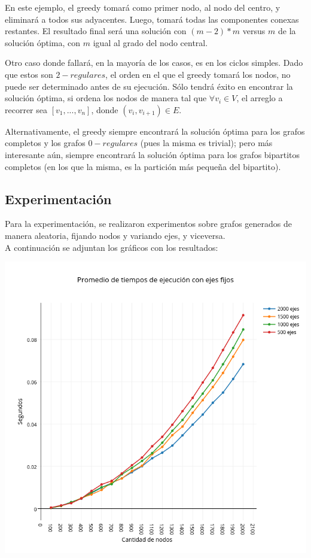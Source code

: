 En este ejemplo, el greedy tomará como primer nodo, al nodo del centro, y eliminará a todos sus adyacentes. Luego, tomará todas las componentes conexas restantes.
El resultado final será una solución con $(m-2)*m$ versus $m$ de la solución óptima, con $m$ igual al grado del nodo central.

Otro caso donde fallará, en la mayoría de los casos, es en los ciclos simples. Dado que estos son $2-regulares$, el orden en el que el greedy tomará los nodos, no puede ser determinado antes de su ejecución. Sólo tendrá éxito en encontrar la solución óptima, si ordena los nodos de manera tal que $\forall v_{i} \in V$, el arreglo a recorrer sea $[v_{1},...,v_{n}]$, donde $(v_{i},v_{i+1}) \in E$.

Alternativamente, el greedy siempre encontrará la solución óptima para los grafos completos y los grafos $0-regulares$ (pues la misma es trivial); pero más interesante aún, siempre encontrará la solución óptima para los grafos bipartitos completos (en los que la misma, es la partición más pequeña del bipartito).
\subsection{Experimentaci\'on}
Para la experimentación, se realizaron experimentos sobre grafos generados de manera aleatoria, fijando nodos y variando ejes, y viceversa.\\

A continuación se adjuntan los gráficos con los resultados:

\includegraphics[width=15cm,keepaspectratio=yes]{imagenes/greedy/fixedge.png}

